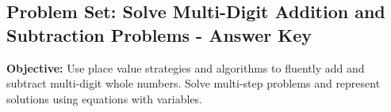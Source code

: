 \documentclass[12pt]{article}
\title{}
\date{}
\begin{document}
\subsection*{Problem Set: Solve Multi-Digit Addition and Subtraction Problems - Answer Key}
\onehalfspacing

\begin{tcolorbox}[colframe=black!40, colback=gray!5, 
coltitle=black, colbacktitle=black!20, fonttitle=\bfseries\Large, 
title=Learning Objective, halign title=center, left=5pt, right=5pt, top=5pt, bottom=15pt]
\textbf{Objective:} Use place value strategies and algorithms to fluently add and subtract multi-digit whole numbers. Solve multi-step problems and represent solutions using equations with variables.
\end{tcolorbox}
\end{document}
